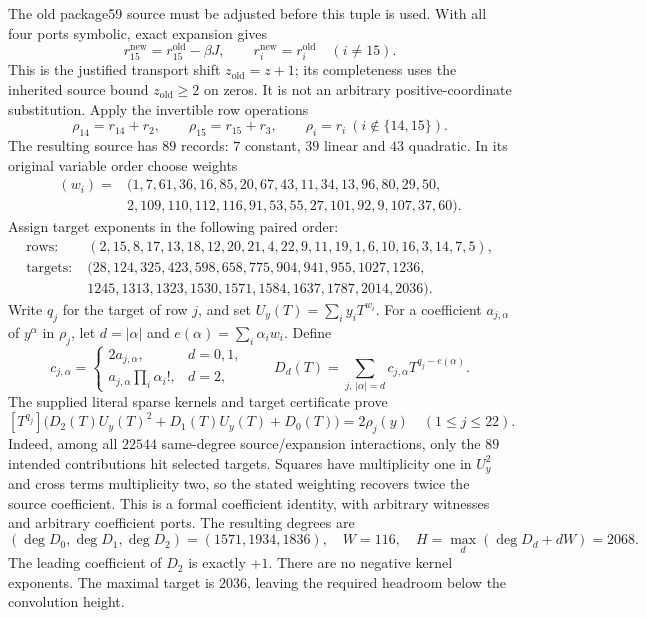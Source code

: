 The old package59 source must be adjusted before this tuple is used.
With all four ports symbolic, exact expansion gives
\[
 r_{15}^{\mathrm{new}}=r_{15}^{\mathrm{old}}-\beta J,
 \qquad r_i^{\mathrm{new}}=r_i^{\mathrm{old}}\quad(i\ne15).
\]
This is the justified transport shift $z_{\mathrm{old}}=z+1$; its
completeness uses the inherited source bound $z_{\mathrm{old}}\ge2$ on
zeros.  It is not an arbitrary positive-coordinate substitution.  Apply
the invertible row operations
\[
 \rho_{14}=r_{14}+r_2,\qquad \rho_{15}=r_{15}+r_3,
 \qquad \rho_i=r_i\ (i\notin\{14,15\}).
\]
The resulting source has $89$ records: $7$ constant, $39$ linear and
$43$ quadratic.  In its original variable order choose weights
\[
\begin{split}
(w_i)={}&(1,7,61,36,16,85,20,67,43,11,34,13,96,80,29,50,\\
 &2,109,110,112,116,91,53,55,27,101,92,9,107,37,60).
\end{split}
\]
Assign target exponents in the following paired order:
\[
\begin{split}
\text{rows}:\;&(2,15,8,17,13,18,12,20,21,4,22,9,11,19,1,6,10,16,3,14,7,5),\\
\text{targets}:\;&(28,124,325,423,598,658,775,904,941,955,1027,1236,\\
 &1245,1313,1323,1530,1571,1584,1637,1787,2014,2036).
\end{split}
\]
Write $q_j$ for the target of row $j$, and set
$U_y(T)=\sum_i y_iT^{w_i}$.  For a coefficient $a_{j,\alpha}$ of
$y^\alpha$ in $\rho_j$, let $d=|\alpha|$ and
$e(\alpha)=\sum_i\alpha_iw_i$.  Define
\[
 c_{j,\alpha}=
 \begin{cases}
 2a_{j,\alpha},&d=0,1,\\
 a_{j,\alpha}\prod_i\alpha_i!,&d=2,
 \end{cases}
 \qquad
 D_d(T)=\sum_{j,\,|\alpha|=d}
       c_{j,\alpha}T^{q_j-e(\alpha)}.
\]
The supplied literal sparse kernels and target certificate prove
\[
 [T^{q_j}]\bigl(D_2(T)U_y(T)^2+D_1(T)U_y(T)+D_0(T)\bigr)
       =2\rho_j(y) \quad (1\le j\le22).
\]
Indeed, among all $22544$ same-degree source/expansion interactions,
only the $89$ intended contributions hit selected targets.  Squares
have multiplicity one in $U_y^2$ and cross terms multiplicity two, so
the stated weighting recovers twice the source coefficient.  This is a
formal coefficient identity, with arbitrary witnesses and arbitrary
coefficient ports.  The resulting degrees are
\[
 (\deg D_0,\deg D_1,\deg D_2)=(1571,1934,1836),\quad W=116,
 \quad H=\max_d(\deg D_d+dW)=2068.
\]
The leading coefficient of $D_2$ is exactly $+1$.  There are no negative
kernel exponents.  The maximal target is $2036$, leaving the required
headroom below the convolution height.

